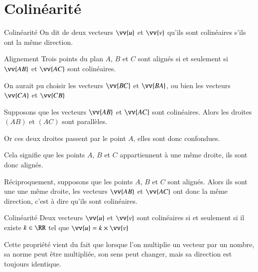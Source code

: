 \documentclass[oneside,12pt]{article}          %
\begin{document}
\section{Colinéarité}

\begin{definition}{Colinéarité}
On dit de deux vecteurs $\vv{u}$ et $\vv{v}$ qu'ils sont colinéaires s'ils ont la même direction.
\end{definition}



\begin{minipage}{0.48\linewidth}
    \begin{propriete}{Alignement}
	    Trois points du plan $A$, $B$ et $C$ sont alignés si et seulement si $\vv{AB}$ et $\vv{AC}$ sont colinéaires.
    \end{propriete}
\end{minipage}\hspace{5mm}
\begin{minipage}{0.48\linewidth}
    \begin{remarque}
    On aurait pu choisir les vecteurs $\vv{BC}$ et $\vv{BA}$, ou bien les vecteurs $\vv{CA}$ et $\vv{CB}$
    \end{remarque}
\end{minipage}

\begin{demonstration}
	Supposons que les vecteurs $\vv{AB}$ et $\vv{AC}$ sont colinéaires. Alors les droites $(AB)$ et $(AC)$ sont parallèles. 
	
	Or ces deux droites passent par le point $A$, elles sont donc confondues. 
	
	Cela signifie que les points $A$, $B$ et $C$ appartiennent à une même droite, ils sont donc alignés.
	
	Réciproquement, supposons que les points $A$, $B$ et $C$ sont alignés. Alors ils sont une une même droite, les vecteurs $\vv{AB}$ et $\vv{AC}$ ont donc la même direction, c'est à dire qu'ils sont colinéaires.
\end{demonstration}

\begin{theoreme}{Colinéarité}
Deux vecteurs $\vv{u}$ et $\vv{v}$ sont colinéaires si et seulement si il existe $k\in\RR$ tel que $\vv{u}=k\times\vv{v}$
\end{theoreme}

\begin{remarque}
Cette propriété vient du fait que lorsque l'on multiplie un vecteur par un nombre, sa norme peut être multipliée, son sens peut changer, mais sa direction est toujours identique.
\end{remarque}
\end{document}
